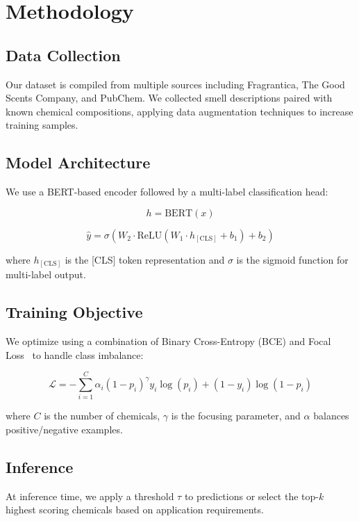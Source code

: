 \section{Methodology}

\subsection{Data Collection}

Our dataset is compiled from multiple sources including Fragrantica, The Good Scents Company, and PubChem. We collected smell descriptions paired with known chemical compositions, applying data augmentation techniques to increase training samples.

\subsection{Model Architecture}

We use a BERT-based encoder followed by a multi-label classification head:

\begin{equation}
    h = \text{BERT}(x)
\end{equation}

\begin{equation}
    \hat{y} = \sigma(W_2 \cdot \text{ReLU}(W_1 \cdot h_{[\text{CLS}]} + b_1) + b_2)
\end{equation}

where $h_{[\text{CLS}]}$ is the [CLS] token representation and $\sigma$ is the sigmoid function for multi-label output.

\subsection{Training Objective}

We optimize using a combination of Binary Cross-Entropy (BCE) and Focal Loss~\cite{lin2017focal} to handle class imbalance:

\begin{equation}
    \mathcal{L} = -\sum_{i=1}^{C} \alpha_i (1-p_i)^\gamma y_i \log(p_i) + (1-y_i) \log(1-p_i)
\end{equation}

where $C$ is the number of chemicals, $\gamma$ is the focusing parameter, and $\alpha$ balances positive/negative examples.

\subsection{Inference}

At inference time, we apply a threshold $\tau$ to predictions or select the top-$k$ highest scoring chemicals based on application requirements.
